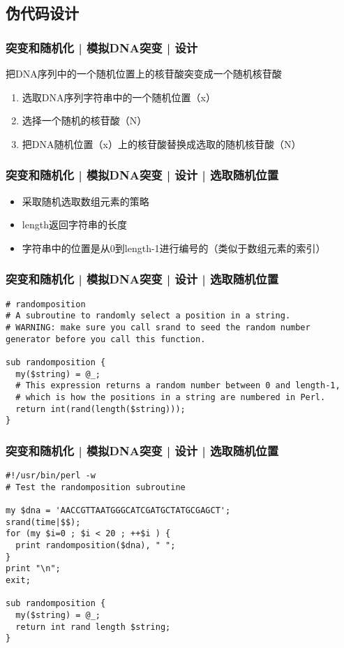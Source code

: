 \subsection{伪代码设计}
\begin{frame}
  \frametitle{突变和随机化 | 模拟DNA突变 | 设计}
  \begin{block}{把DNA序列中的一个随机位置上的核苷酸突变成一个随机核苷酸}
    \begin{enumerate}
      \item 选取DNA序列字符串中的一个随机位置（x）
      \item 选择一个随机的核苷酸（N）
      \item 把DNA随机位置（x）上的核苷酸替换成选取的随机核苷酸（N）
    \end{enumerate}
  \end{block}
\end{frame}

\begin{frame}
  \frametitle{突变和随机化 | 模拟DNA突变 | 设计 | \alert{选取随机位置}}
  \begin{itemize}
    \item 采取随机选取数组元素的策略
    \item length返回字符串的长度
    \item 字符串中的位置是从0到length-1进行编号的（类似于数组元素的索引）
  \end{itemize}
\end{frame}

\begin{frame}[fragile]
  \frametitle{突变和随机化 | 模拟DNA突变 | 设计 | 选取随机位置}
  \vspace{-1.5em}
\begin{lstlisting}
# randomposition
# A subroutine to randomly select a position in a string.
# WARNING: make sure you call srand to seed the random number generator before you call this function.

sub randomposition {
  my($string) = @_;
  # This expression returns a random number between 0 and length-1,
  # which is how the positions in a string are numbered in Perl.
  return int(rand(length($string)));
}
\end{lstlisting}
\end{frame}

\begin{frame}[fragile]
  \frametitle{突变和随机化 | 模拟DNA突变 | 设计 | \alert{选取随机位置}}
  \vspace{-1.5em}
\begin{lstlisting}
#!/usr/bin/perl -w
# Test the randomposition subroutine

my $dna = 'AACCGTTAATGGGCATCGATGCTATGCGAGCT';
srand(time|$$);
for (my $i=0 ; $i < 20 ; ++$i ) {
  print randomposition($dna), " ";
}
print "\n";
exit;
  
sub randomposition {
  my($string) = @_;
  return int rand length $string;
}
\end{lstlisting}
\end{frame}

